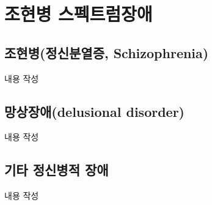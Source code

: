 \section{조현병 스펙트럼장애}

\subsection{조현병(정신분열증, Schizophrenia)}
내용 작성

\subsection{망상장애(delusional disorder)}
내용 작성

\subsection{기타 정신병적 장애}
내용 작성
